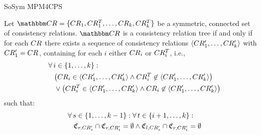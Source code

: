 \begin{copiedFrom}{SoSym MPM4CPS}
\begin{lemma} \label{lemma:treehassequence}
    Let $\consistencyrelationset{CR} = \setted{\consistencyrelation{CR}{1}, \consistencyrelation{CR^T}{1}, \dots, \consistencyrelation{CR}{k}, \consistencyrelation{CR^T}{k}}$ be a symmetric, connected set of consistency relations.
    $\consistencyrelationset{CR}$ is a consistency relation tree if and only if for each $CR_{}$ there exists a sequence of consistency relations $\langle CR'_{1}, \dots, CR'_{k} \rangle$ with $CR'_{1} = CR_{}$, containing for each $i$ either $CR_{i}$ or $CR^T_{i}$, i.e.,
    \begin{align*}
        \formulaskip &
        \forall i \in \setted{1, \dots, k} :\\
        & \formulaskip 
        \bigl( \consistencyrelation{CR}{i} \in \tupled{\consistencyrelation{CR'}{1}, \dots, \consistencyrelation{CR'}{k}}
        \land \consistencyrelation{CR^T}{i} \not\in \tupled{\consistencyrelation{CR'}{1}, \dots, \consistencyrelation{CR'}{k}} \bigl)\\
        & \formulaskip 
        \lor \bigl(\consistencyrelation{CR^T}{i} \in \tupled{\consistencyrelation{CR'}{1}, \dots, \consistencyrelation{CR'}{k}}
        \land \consistencyrelation{CR}{i} \not\in \tupled{\consistencyrelation{CR'}{1}, \dots, \consistencyrelation{CR'}{k}} \bigl)
    \end{align*}
    such that:
    \begin{align*}
        \formulaskip &
        \forall s \in \setted{1, \dots, k-1} : \forall t \in \setted{i+1, \dots, k} : \\
        & \formulaskip
        \classtuple{C}{r,\consistencyrelation{CR'}{s}} \cap \classtuple{C}{r,\consistencyrelation{CR'}{t}} = \emptyset 
        \land
        \classtuple{C}{l,\consistencyrelation{CR'}{s}} \cap 
        \classtuple{C}{r,\consistencyrelation{CR'}{t}} = \emptyset
    \end{align*}
\end{lemma}


\end{copiedFrom}
